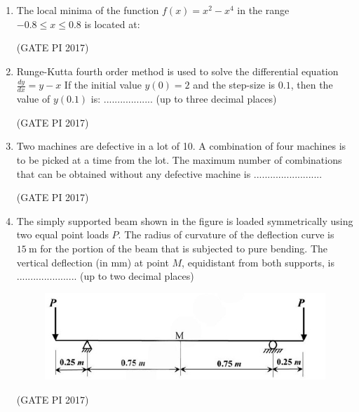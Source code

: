 \documentclass[journal,12pt,onecolumn]{IEEEtran}
\theoremstyle{remark}
\begin{document}
\begin{enumerate}
\item The local minima of the function $f(x) = x^{2} - x^{4}$ in the range $-0.8 \leq x \leq 0.8$ is located at:
\begin{enumerate}
\end{enumerate}
\hfill (GATE PI 2017)

\item Runge\--Kutta fourth order method is used to solve the differential equation
$
\frac{dy}{dx} = y - x
$
If the initial value $y(0) = 2$ and the step-size is $0.1$, then the value of $y(0.1)$ is:  
.................. (up to three decimal places)  

\hfill (GATE PI 2017)

\item Two machines are defective in a lot of 10. A combination of four machines is to be picked at a time from the lot.  
The maximum number of combinations that can be obtained without any defective machine is .........................
  
\hfill (GATE PI 2017)

\newpage
\item The simply supported beam shown in the figure is loaded symmetrically using two equal point loads $P$.  
The radius of curvature of the deflection curve is $15 \ \text{m}$ for the portion of the beam that is subjected to pure bending.  
The vertical deflection (in mm) at point $M$, equidistant from both supports, is ...................... (up to two decimal places)

\begin{figure}[h]
    \centering
    \includegraphics[width=0.5\linewidth]{fig4.png}
    \caption{}
    \label{fig:placeholder}
\end{figure}

\hfill (GATE PI 2017)


\end{enumerate}
\end{document}
